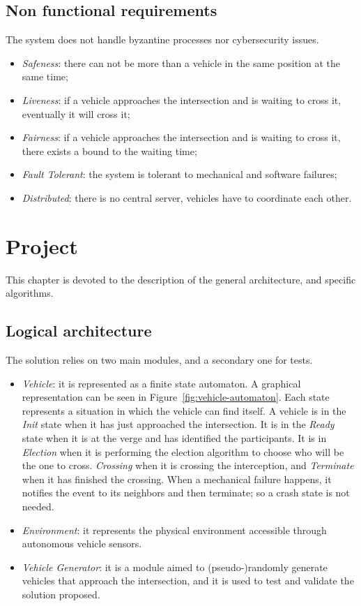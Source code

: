 \documentclass{memoir}
\begin{document}
\section{Non functional requirements}
The system does not handle byzantine processes nor cybersecurity issues.

\begin{itemize}
	\item \emph{Safeness}: there can not be more than a vehicle in the same position at the same time;
	\item \emph{Liveness}: if a vehicle approaches the intersection and is waiting to cross it, eventually it will cross it;
	\item \emph{Fairness}: if a vehicle approaches the intersection and is waiting to cross it, there exists a bound to the waiting time;
	\item \emph{Fault Tolerant}: the system is tolerant to mechanical and software failures;
	\item \emph{Distributed}: there is no central server, vehicles have to coordinate each other.
\end{itemize}



\chapter{Project}\label{ch:project}
This chapter is devoted to the description of the general architecture, and specific algorithms.

\section{Logical architecture}
The solution relies on two main modules, and a secondary one for tests.

\begin{itemize}
	\item \emph{Vehicle}: it is represented as a finite state automaton. A graphical representation can be seen in Figure~\ref{fig:vehicle-automaton}. Each state represents a situation in which the vehicle can find itself. A vehicle is in the \emph{Init} state when it has just approached the intersection. It is in the \emph{Ready} state when it is at the verge and has identified the participants. It is in \emph{Election} when it is performing the election algorithm to choose who will be the one to cross. \emph{Crossing} when it is crossing the interception, and \emph{Terminate} when it has finished the crossing. When a mechanical failure happens, it notifies the event to its neighbors and then terminate; so a crash state is not needed.
	\item \emph{Environment}: it represents the physical environment accessible through autonomous vehicle sensors.
	\item \emph{Vehicle Generator}: it is a module aimed to (pseudo-)randomly generate vehicles that approach the intersection, and it is used to test and validate the solution proposed.
\end{itemize}
\end{document}

